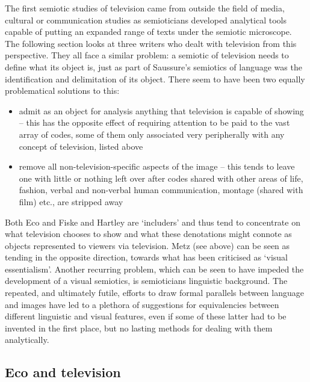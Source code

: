 \bigskip
 
The first semiotic studies of television came from outside the field of media, cultural or communication studies as semioticians developed analytical tools capable of putting an expanded range of texts under the semiotic microscope. The following section looks at three writers who dealt with television from this perspective. They all face a similar problem: a semiotic of television needs to define what its object is, just as part of Saussure's semiotics of language was the identification and delimitation of its object. There seem to have been two equally problematical solutions to this:
\begin{itemize}
\item admit as an object for analysis anything that television is capable of showing -- this has the opposite effect of requiring attention to be paid to the vast array of codes, some of them only associated very peripherally with any concept of television, listed above
\item remove all non-television-specific aspects of the image -- this tends to leave one with little or nothing left over after codes shared with other areas of life, fashion, verbal and non-verbal human communication, montage (shared with film) etc., are stripped away
\end{itemize}

Both Eco and Fiske and Hartley are `includers' and thus tend to concentrate on what television chooses to show and what these denotations might connote as objects represented to viewers via television. Metz (see above) can be seen as tending in the opposite direction, towards what has been criticised as `visual essentialism'. Another recurring problem, which can be seen to have impeded the development of a visual semiotics, is semioticians linguistic background. The repeated, and ultimately futile, efforts to draw formal parallels between language and images have led to a plethora of suggestions for equivalencies between  different linguistic and visual features, even if some of these latter had to be invented in the first place, but no lasting methods for dealing with them analytically.

\subsection{Eco and television}
\label{subsec:eco}

